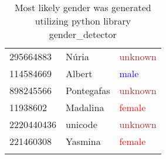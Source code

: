 \begin{table}[!htbp]
\begin{center}
\begin{minipage}{0.4\textwidth}
\begin{tabular}{|l l l|}
			295664883 & Núria & \textcolor{brown}{unknown}\\
			114584669 & Albert & \textcolor{blue}{male}\\
			898245566 & Pontegafas & \textcolor{brown}{unknown}\\
			11938602 & Madalina & \textcolor{red}{female}\\
			2220440436 & unicode & \textcolor{brown}{unknown}\\
			221460308 & Yasmina & \textcolor{red}{female}\\
			& &\\
			\hline
		\end{tabular}
	\end{minipage}	
	\caption*{\scriptsize Most likely gender was generated utilizing python library gender\_detector}
	 \end{center}
\end{table}